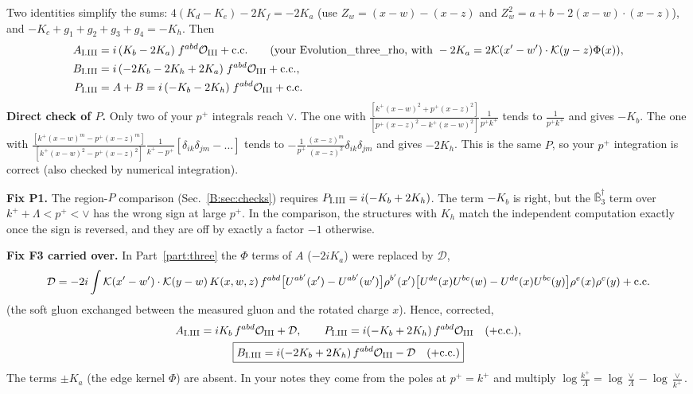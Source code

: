 \documentclass[10pt]{article}
\numberwithin{equation}{section}
\newcommand{\KK}{\mathcal K}
\newcommand{\kp}{k^+}
\newcommand{\pp}{p^+}
\begin{document}
Two identities simplify the sums: $4(K_d-K_e)-2K_f=-2K_a$ (use $Z_w=(x-w)-(x-z)$ and $Z_w^2=a+b-2(x-w)\cdot(x-z)$), and $-K_c+g_1+g_2+g_3+g_4=-K_h$. Then
\begin{align}
A_{\rm I.III}&=i\,(K_b-2K_a)\;f^{abd}\mathcal O_{\rm III}+{\rm c.c.}\qquad\text{(your Evolution\_three\_rho, with }-2K_a=2\KK(x'-w')\cdot\KK(y-z)\Phi(x)),\notag\\
B_{\rm I.III}&=i\,(-2K_b-2K_h+2K_a)\;f^{abd}\mathcal O_{\rm III}+{\rm c.c.},\notag\\
P_{\rm I.III}&=A+B=i\,(-K_b-2K_h)\;f^{abd}\mathcal O_{\rm III}+{\rm c.c.}
\end{align}
\textbf{Direct check of $P$.} Only two of your $\pp$ integrals reach $\vee$. The one with $\frac{[k^+(x-w)^2+\pp(x-z)^2]}{[\pp(x-z)^2-k^+(x-w)^2]}\frac{1}{\pp k^+}$ tends to $\frac{1}{\pp k^+}$ and gives $-K_b$. The one with $\frac{[k^+(x-w)^m-\pp(x-z)^m]}{[k^+(x-w)^2-\pp(x-z)^2]}\frac{1}{k^+-\pp}[\delta_{ik}\delta_{jm}-\dots]$ tends to $-\frac{1}{\pp}\frac{(x-z)^m}{(x-z)^2}\delta_{ik}\delta_{jm}$ and gives $-2K_h$. This is the same $P$, so your $\pp$ integration is correct (also checked by numerical integration).

\textbf{Fix P1.} The region-$P$ comparison (Sec.~\ref{B:sec:checks}) requires $P_{\rm I.III}=i(-K_b+2K_h)$. The term $-K_b$ is right, but the $\bar{\mathbb B}_3^\dagger$ term over $\kp+\Lambda<\pp<\vee$ has the wrong sign at large $\pp$. In the comparison, the structures with $K_h$ match the independent computation exactly once the sign is reversed, and they are off by exactly a factor $-1$ otherwise.

\textbf{Fix F3 carried over.} In Part~\ref{part:three} the $\Phi$ terms of $A$ ($-2iK_a$) were replaced by $\mathcal D$,
\[
\mathcal D=-2i\int\KK(x'-w')\cdot\KK(y-w)\,K(x,w,z)\,f^{abd}\big[U^{ab'}(x')-U^{ab'}(w')\big]\rho^{b'}(x')\big[U^{de}(x)U^{bc}(w)-U^{de}(x)U^{bc}(y)\big]\rho^e(x)\rho^c(y)+{\rm c.c.}
\]
(the soft gluon exchanged between the measured gluon and the rotated charge $x$). Hence, corrected,
\begin{gather}
A_{\rm I.III}=iK_b\,f^{abd}\mathcal O_{\rm III}+\mathcal D,\qquad P_{\rm I.III}=i(-K_b+2K_h)\,f^{abd}\mathcal O_{\rm III}\quad(+{\rm c.c.}),\notag\\
\boxed{B_{\rm I.III}=i(-2K_b+2K_h)\,f^{abd}\mathcal O_{\rm III}-\mathcal D\quad(+{\rm c.c.})}
\end{gather}
The terms $\pm K_a$ (the edge kernel $\Phi$) are absent. In your notes they come from the poles at $\pp=\kp$ and multiply $\log\frac{k^+}{\Lambda}=\log\frac{\vee}{\Lambda}-\log\frac{\vee}{k^+}$.
\end{document}
